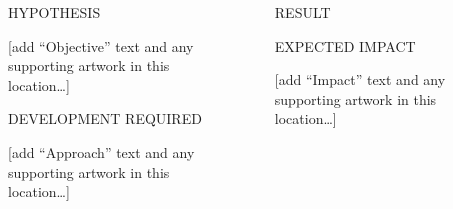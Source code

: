 \documentclass[final,t]{beamer}
\newcommand{\EEESMLarge}{\fontsize{72}{86}\selectfont}
\begin{document}
\begin{frame}[fragile]{}


  \LARGE
  \begin{columns}[t]


    \begin{column}{0.01\linewidth}
    \end{column}

    \begin{column}{0.48\linewidth}
      \begin{block}{\EEESMLarge HYPOTHESIS}
      \end{block}
      
      [add “Objective” text and any supporting artwork in this location…]

      \begin{block}{\EEESMLarge DEVELOPMENT REQUIRED}
      \end{block}
      [add “Approach” text and any supporting artwork in this location…]
    \end{column}


    \begin{column}{0.01\linewidth}
    \end{column}

    \begin{column}{0.48\linewidth}
      \begin{block}{\EEESMLarge RESULT}
      \end{block}

      \begin{block}{\EEESMLarge EXPECTED IMPACT}
      \end{block}
      [add “Impact” text and any supporting artwork in this location…]

    \end{column}
    
  \end{columns}

\end{frame}
\end{document}
